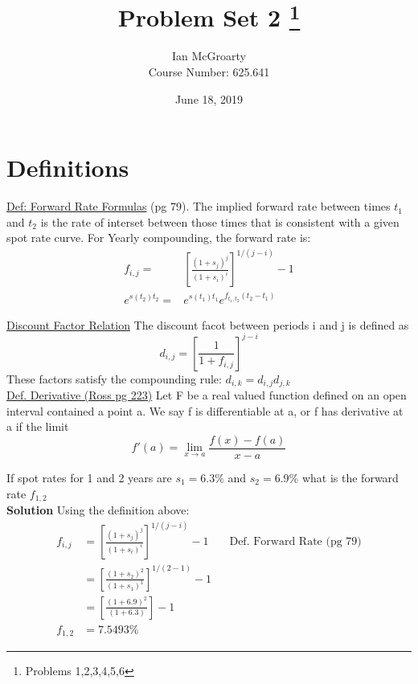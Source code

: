 \documentclass[12pt]{article}
\title{Problem Set 2 \thanks{Problems 1,2,3,4,5,6}}
\author{Ian McGroarty \\
	Course Number: 625.641}
\date{June 18, 2019}
\newenvironment{problem}[3][Problem]{\begin{trivlist}
\item[\hskip \labelsep {\bfseries #1}\hskip \labelsep {\bfseries #2.}]}{\end{trivlist}}
\begin{document}
\maketitle
\section{Definitions}
\underline{Def: Forward Rate Formulas} (pg 79). The implied forward rate between times $t_1$ and $t_2$ is the rate of interset between those times that is consistent with a given spot rate curve. For Yearly compounding, the forward rate is:  
\begin{align*}
f_{i,j} =& [\frac{(1+s_j)^j}{(1+s_i)^i}]^{1/(j-i)}-1 \\
 e^{s(t_2)t_2} =& e^{s(t_1)t_1}e^{f_{t_1,t_2}(t_2-t_1)}
\end{align*}

\underline{Discount Factor Relation} The discount facot between periods i and j is defined as $$ d_{i,j}=[\frac{1}{1+f_{i,j}}]^{j-i}$$ These factors satisfy the compounding rule: $d_{i,k}=d_{i,j}d_{j,k}$\\

\underline{Def. Derivative (Ross pg 223)} Let F be a real valued function defined on an open interval contained a point a. We say f is differentiable at a, or f has derivative at a if the limit $$ f'(a) = \lim_{x \to a} \frac{f(x)-f(a)}{x-a} $$

\newpage
\begin{problem}1. If spot rates for 1 and 2 years are $s_1 = 6.3\%$ and $s_2 = 6.9\%$ what is the forward rate $f_{1,2}$ \\
\textbf{Solution} Using the definition above: 
\begin{align*}
 f_{i,j} &= [\frac{(1+s_j)^j}{(1+s_i)^i}]^{1/(j-i)}-1 && \text{Def. Forward Rate (pg 79)} \\ 
&= [\frac{(1+s_2)^2}{(1+s_1)^1}]^{1/(2-1)}-1 \\ 
&= [\frac{(1+6.9)^2}{(1+6.3)}]-1 \\
f_{1,2} &= 7.5493 \%
\end{align*}
\end{problem}
\end{document}
